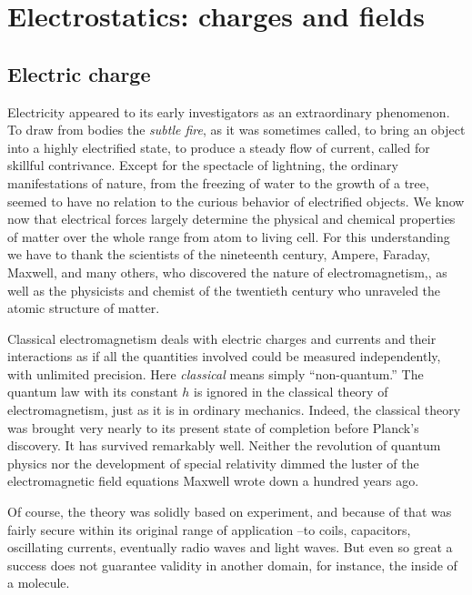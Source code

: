 \chapter{Electrostatics: charges and fields}

\section{Electric charge}

Electricity appeared to its early investigators as an extraordinary phenomenon.
To draw from bodies the \emph{subtle fire}, as it was
sometimes called, to bring an object into a highly electrified state, to
produce a steady flow of current, called for skillful contrivance. Except for
the spectacle of lightning, the ordinary manifestations of nature, from the
freezing of water to the growth of a tree, seemed to have no relation to the
curious behavior of electrified objects. We know now that electrical forces
largely determine the physical and chemical properties of matter over the whole
range from atom to living cell. For this understanding we have to thank the
scientists of the nineteenth century, Ampere, Faraday, Maxwell, and many
others, who discovered the nature of electromagnetism,, as well as the
physicists and chemist of the twentieth century who unraveled the atomic
structure of matter. 

Classical electromagnetism deals with electric charges and
currents and their interactions as if all the quantities involved could be
measured independently, with unlimited precision. Here \emph{classical} means
simply ``non-quantum.'' The quantum law with its constant $h$ is ignored in the
classical theory of electromagnetism, just as it is in ordinary mechanics. Indeed,
the classical theory was brought very nearly to its present state of completion
before Planck's discovery. It has survived remarkably well. Neither the
revolution of quantum physics nor the development of special relativity dimmed
the luster of the electromagnetic field equations Maxwell wrote down a hundred
years ago. 

Of course, the theory was solidly based on experiment, and
because of that was fairly secure within its original range of application --to
coils, capacitors, oscillating currents, eventually radio waves and light
waves. But even so great a success does not guarantee validity in another
domain, for instance, the inside of a molecule.

